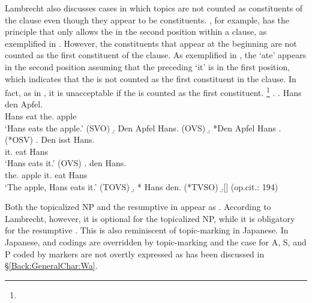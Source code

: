 Lambrecht also discusses cases in which
topics are not counted as constituents of the clause
even though they appear to be constituents.
, for example, has the principle that only allows the  in the second position within a clause, as exemplified in \Next[a-d].
However, the  constituents that appear at the beginning are not counted as the first constituent of the clause.
As exemplified in \Next[e],
the   `ate' appears in the second position assuming that the preceding  `it' is in the first position,
which indicates that
the   is not counted as the first constituent in the clause.
In fact, as in \Next[f],
it is unacceptable
if the   is counted as the first constituent.%
 \footnote{
 }
%
\ex.\label{Par:Subj:Ex:Ex:Apfel}
 \ag. Hans  den Apfel. \\
   Hans eat the. apple \\
   `Hans eats the apple.' \hfill{(SVO)}
 \b. Den Apfel  Hans. \hfill{(OVS)}
 \b. *Den Apfel Hans .\hfill{(*OSV)}
 \bg. Den isst Hans. \\
   it. eat Hans \\
   `Hans eats it.' \hfill{(OVS)}
 \bg.   den  Hans. \\
   the. apple it. eat Hans \\
   `The apple, Hans eats it.'  \hfill{(TOVS)}
 \b. *   Hans den. \hfill{(*TVSO)}
 \b.[] \hfill{(op.cit.: 194)}

Both the topicalized NP  and the resumptive   in \Last[e] appear as .
According to Lambrecht, however,
it is optional for the topicalized NP,
while it is obligatory for the resumptive .
This is also reminiscent of topic-marking in Japanese.
In Japanese,
 and  codings are overridden by topic-marking
and the case for A, S, and P coded by  markers are not overtly expressed
as has been discussed in \S \ref{Back:GeneralChar:Wa}.


